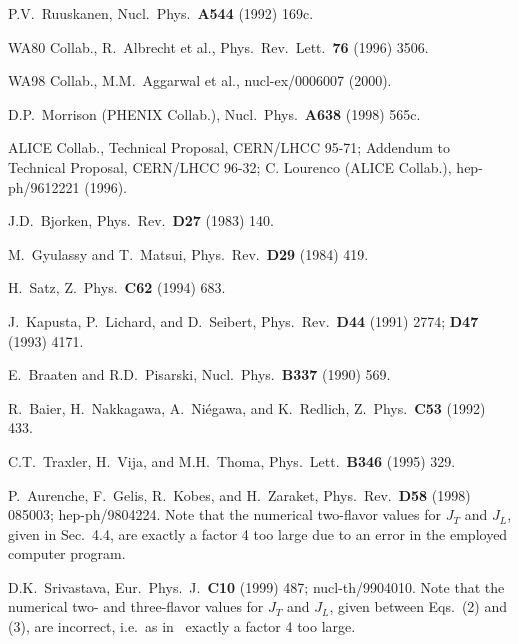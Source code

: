 \documentclass[12pt,twoside,fleqn]{article}
\begin{document}
%
\begin{thebibliography}{00}
%
%

 P.V.\ Ruuskanen, Nucl.\ Phys.\ {\bf A544} (1992) 169c. 

 WA80 Collab., R.\ Albrecht et al., Phys.\ Rev.\ Lett.\ {\bf 76} (1996) 3506.

 WA98 Collab., M.M.\ Aggarwal et al., nucl-ex/0006007 (2000).

 D.P.\ Morrison (PHENIX Collab.), Nucl.\ Phys.\ {\bf A638} (1998) 565c.
  
 ALICE Collab., Technical Proposal, CERN/LHCC 95-71;
  Addendum to Technical Proposal, CERN/LHCC 96-32; C. Lourenco (ALICE Collab.),
  \mbox{hep-ph/9612221} (1996).

 J.D.\ Bjorken, Phys.\ Rev.\ {\bf D27} (1983) 140.

 M.\ Gyulassy and T.\ Matsui, Phys.\ Rev.\ {\bf D29} (1984) 419.

 H.\ Satz, Z.\ Phys.\ {\bf C62} (1994) 683.


 J.\ Kapusta, P.\ Lichard, and D.\ Seibert, Phys.\ Rev.\ {\bf D44} (1991) 2774; {\bf D47} (1993) 4171. 
  
 E.\ Braaten and R.D.\ Pisarski, Nucl.\ Phys.\ {\bf B337} (1990) 569.

 R.\ Baier, H.\ Nakkagawa, A.\ Ni\'{e}gawa, and K.\ Redlich, Z.\ Phys.\ {\bf C53} (1992) 433.

 C.T.\ Traxler, H.\ Vija, and M.H.\ Thoma, Phys.\ Lett.\ {\bf B346} (1995) 329.
  
 P.\ Aurenche, F.\ Gelis, R.\ Kobes, and H.\ Zaraket,
  Phys.\ Rev.\ {\bf D58} (1998) 085003; \mbox{hep-ph/9804224}. Note that the
  numerical two-flavor values for $J_T$ and $J_L$, given in Sec.~4.4, are
  exactly a factor 4 too large due to an error in the employed computer program.
  
 D.K.\ Srivastava, Eur.\ Phys.\ J.\ {\bf C10} (1999)
  487; \mbox{nucl-th/9904010}. Note that the numerical two- and three-flavor
  values for $J_T$ and $J_L$, given between Eqs.\ (2) and (3), are incorrect,
  i.e.\ as in~\cite{AURENCHE_1998} exactly a factor 4 too large.


\end{thebibliography}
\end{document}
